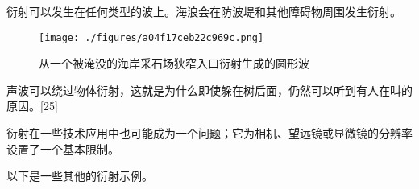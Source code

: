 衍射可以发生在任何类型的波上。海浪会在防波堤和其他障碍物周围发生衍射。
\begin{figure}[ht]
\centering
\texttt{[image: ./figures/a04f17ceb22c969c.png]}
\caption{从一个被淹没的海岸采石场狭窄入口衍射生成的圆形波} \label{fig_YS_14}
\end{figure}
声波可以绕过物体衍射，这就是为什么即使躲在树后面，仍然可以听到有人在叫的原因。[25]

衍射在一些技术应用中也可能成为一个问题；它为相机、望远镜或显微镜的分辨率设置了一个基本限制。

以下是一些其他的衍射示例。